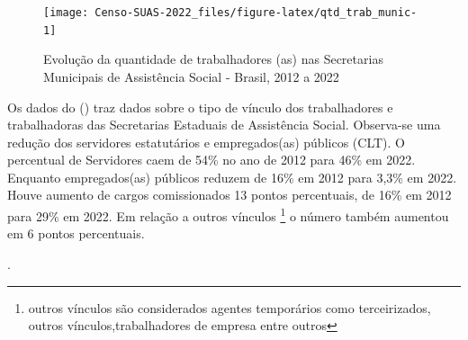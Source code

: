 \documentclass[
  brazilian]{report}
\begin{document}
\begin{figure}
\texttt{[image: Censo-SUAS-2022\_files/figure-latex/qtd\_trab\_munic-1]} \caption[Evolução da quantidade de trabalhadores (as) nas Secretarias Municipais de Assistência Social - Brasil, 2012 a 2022]{Evolução da quantidade de trabalhadores (as) nas Secretarias Municipais de Assistência Social - Brasil, 2012 a 2022}\label{fig:qtd_trab_munic}
\end{figure}

Os dados do () traz dados sobre o tipo de vínculo
dos trabalhadores e trabalhadoras das Secretarias Estaduais de
Assistência Social. Observa-se uma redução dos servidores estatutários e
empregados(as) públicos (CLT). O percentual de Servidores caem de 54\%
no ano de 2012 para 46\% em 2022. Enquanto empregados(as) públicos
reduzem de 16\% em 2012 para 3,3\% em 2022. Houve aumento de cargos
comissionados 13 pontos percentuais, de 16\% em 2012 para 29\% em 2022.
Em relação a outros vínculos
\footnote{outros vínculos são considerados agentes temporários como terceirizados, outros vínculos,trabalhadores de empresa entre outros}
o número também aumentou em 6 pontos percentuais.

.
\end{document}
